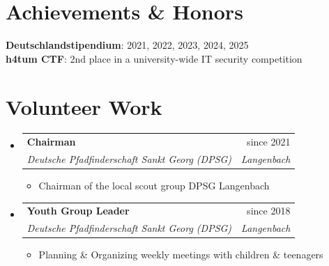 \documentclass[letterpaper,11pt]{article}
\makeatletter
\newcommand{\resumeItem}[1]{
    \item\small{
            {#1 \vspace{-2pt}}
    }
}
\newcommand{\resumeSubheading}[4]{
    \vspace{-2pt}\item
    \begin{tabular*}{0.97\textwidth}[t]{l@{\extracolsep{\fill}}r}
    \textbf{#1} & #2 \\
    \textit{\small#3} & \textit{\small #4} \\
    \end{tabular*}\vspace{-7pt}
}
\newcommand{\resumeSubHeadingListStart}{\begin{itemize}[leftmargin=0.15in, label={}]}
\newcommand{\resumeSubHeadingListEnd}{\end{itemize}}
\newcommand{\resumeItemListStart}{\begin{itemize}}
\newcommand{\resumeItemListEnd}{\end{itemize}\vspace{-5pt}}
\makeatother
\begin{document}
    \section{Achievements \& Honors}
    \begin{itemize}[leftmargin=0.15in, label={}]
        \small{\item{
            \textbf{Deutschlandstipendium}{: 2021, 2022, 2023, 2024, 2025} \\
            \textbf{h4tum CTF}{: 2nd place in a university-wide IT security competition}
        }}
    \end{itemize}

    \section{Volunteer Work}
    \resumeSubHeadingListStart

    \resumeSubheading
    {Chairman}{since 2021}
    {Deutsche Pfadfinderschaft Sankt Georg (DPSG)}{Langenbach}
    \resumeItemListStart
    \resumeItem{Chairman of the local scout group DPSG Langenbach}
    \resumeItemListEnd

    \resumeSubheading
    {Youth Group Leader}{since 2018}
    {Deutsche Pfadfinderschaft Sankt Georg (DPSG)}{Langenbach}
    \resumeItemListStart
    \resumeItem{Planning \& Organizing weekly meetings with children \& teenagers}
    \resumeItemListEnd

    \resumeSubHeadingListEnd
\end{document}
